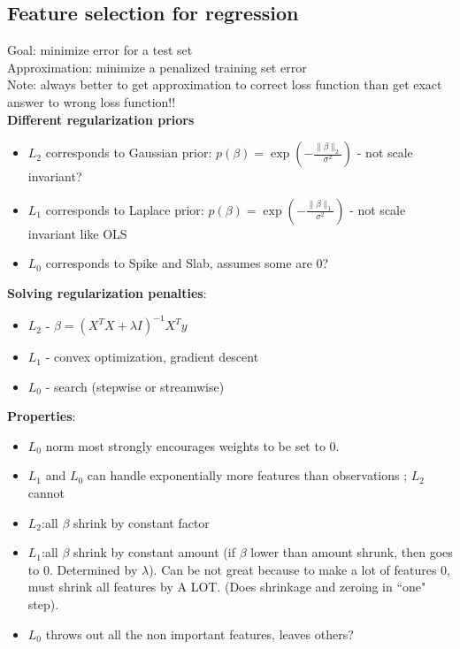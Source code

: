 \documentclass[a4paper]{article}\usepackage[]{graphicx}\usepackage[]{color}
\begin{document}
\subsection{Feature selection for regression}

Goal: minimize error for a test set \\
Approximation: minimize a penalized training set error \\
Note: always better to get approximation to correct loss function than get exact answer to wrong loss function!! \\

\textbf{Different regularization priors}
\begin{itemize}
\item $L_2$ corresponds to Gaussian prior: $p(\beta) = \exp\left(-\frac{\lVert \beta \rVert_2}{\sigma^2}\right)$ - not scale invariant?
\item $L_1$ corresponds to Laplace prior: $p(\beta) = \exp\left(-\frac{\lVert \beta \rVert_1}{\sigma^2}\right)$ - not scale invariant like OLS
\item $L_0$ corresponds to Spike and Slab, assumes some are 0?
\end{itemize}

\textbf{Solving regularization penalties}:
\begin{itemize}
\item $L_2$ - $\beta = (X^T X + \lambda I)^{-1} X^T y$
\item $L_1$ - convex optimization, gradient descent
\item $L_0$ - search (stepwise or streamwise)
\end{itemize}

\textbf{Properties}:
\begin{itemize}
\item $L_0$ norm most strongly encourages weights to be set to 0. 
\item $L_1$ and $L_0$ can handle exponentially more features than observations ; $L_2$ cannot
\item $L_2$:all $\beta$ shrink by constant factor
\item $L_1$:all $\beta$ shrink by constant amount (if $\beta$ lower than amount shrunk, then goes to 0. Determined by $\lambda$). Can be not great because to make a lot of features 0, must shrink all features by A LOT. (Does shrinkage and zeroing in ``one" step).
\item $L_0$ throws out all the non important features, leaves others?
\end{itemize}
\end{document}
